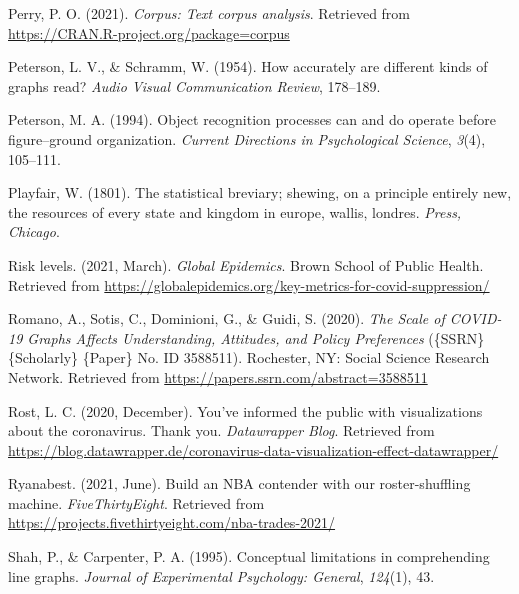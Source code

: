 \documentclass[print]{nuthesis}
\newlength{\cslhangindent}
\newenvironment{CSLReferences}%
{\setlength{\parindent}{0pt}%
\everypar{\setlength{\hangindent}{\cslhangindent}}\ignorespaces}%
{\par}
\begin{document}
\begin{CSLReferences}{1}{0}
\leavevmode{}%
Perry, P. O. (2021). \emph{Corpus: Text corpus analysis}. Retrieved from \url{https://CRAN.R-project.org/package=corpus}

\leavevmode{}%
Peterson, L. V., \& Schramm, W. (1954). How accurately are different kinds of graphs read? \emph{Audio Visual Communication Review}, 178--189.

\leavevmode{}%
Peterson, M. A. (1994). Object recognition processes can and do operate before figure--ground organization. \emph{Current Directions in Psychological Science}, \emph{3}(4), 105--111.

\leavevmode{}%
Playfair, W. (1801). The statistical breviary; shewing, on a principle entirely new, the resources of every state and kingdom in europe, wallis, londres. \emph{Press, Chicago}.

\leavevmode{}%
Risk levels. (2021, March). \emph{Global Epidemics}. Brown School of Public Health. Retrieved from \url{https://globalepidemics.org/key-metrics-for-covid-suppression/}

\leavevmode{}%
Romano, A., Sotis, C., Dominioni, G., \& Guidi, S. (2020). \emph{The {Scale} of {COVID}-19 {Graphs} {Affects} {Understanding}, {Attitudes}, and {Policy} {Preferences}} (\{SSRN\} \{Scholarly\} \{Paper\} No. ID 3588511). Rochester, NY: Social Science Research Network. Retrieved from \url{https://papers.ssrn.com/abstract=3588511}

\leavevmode{}%
Rost, L. C. (2020, December). You've informed the public with visualizations about the coronavirus. Thank you. \emph{Datawrapper Blog}. Retrieved from \url{https://blog.datawrapper.de/coronavirus-data-visualization-effect-datawrapper/}

\leavevmode{}%
Ryanabest. (2021, June). Build an NBA contender with our roster-shuffling machine. \emph{FiveThirtyEight}. Retrieved from \url{https://projects.fivethirtyeight.com/nba-trades-2021/}

\leavevmode{}%
Shah, P., \& Carpenter, P. A. (1995). Conceptual limitations in comprehending line graphs. \emph{Journal of Experimental Psychology: General}, \emph{124}(1), 43.


\end{CSLReferences}
\end{document}
